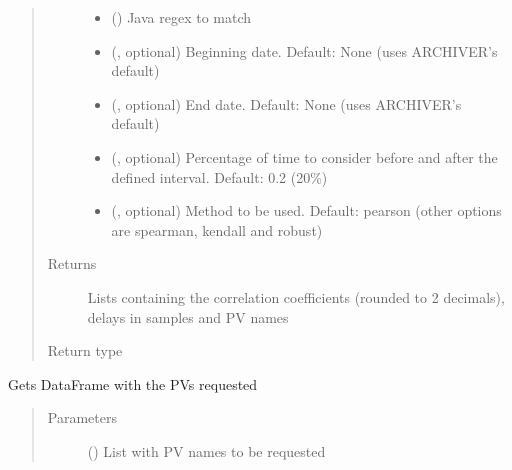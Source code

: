 \documentclass[letterpaper,10pt,english]{sphinxmanual}
\begin{document}
\begin{fulllineitems}
\begin{fulllineitems}
\begin{quote}
\begin{description}
\begin{itemize}
\item {} 
\sphinxAtStartPar
{} () \textendash{} Java regex to match

\item {} 
\sphinxAtStartPar
{} (, optional) \textendash{} Beginning date. Default: None (uses ARCHIVER’s default)

\item {} 
\sphinxAtStartPar
{} (, optional) \textendash{} End date. Default: None (uses ARCHIVER’s default)

\item {} 
\sphinxAtStartPar
{} (, optional) \textendash{} Percentage of time to consider before and after the defined interval. Default: 0.2 (20\%)

\item {} 
\sphinxAtStartPar
{} (, optional) \textendash{} Method to be used. Default: pearson (other options are spearman, kendall and robust)

\end{itemize}

\item[{Returns}] \leavevmode
\sphinxAtStartPar
Lists containing the correlation coefficients (rounded to 2 decimals), delays in samples and PV names

\item[{Return type}] \leavevmode
\sphinxAtStartPar
{}

\end{description}\end{quote}

\end{fulllineitems}


\begin{fulllineitems}
\label{\detokenize{dataset:dataset.Dataset.get_EPICS_pv}}
\sphinxAtStartPar
Gets DataFrame with the PVs requested
\begin{quote}\begin{description}
\item[{Parameters}] \leavevmode
\sphinxAtStartPar
{} () \textendash{} List with PV names to be requested


\end{description}
\end{quote}
\end{fulllineitems}
\end{fulllineitems}
\end{document}
